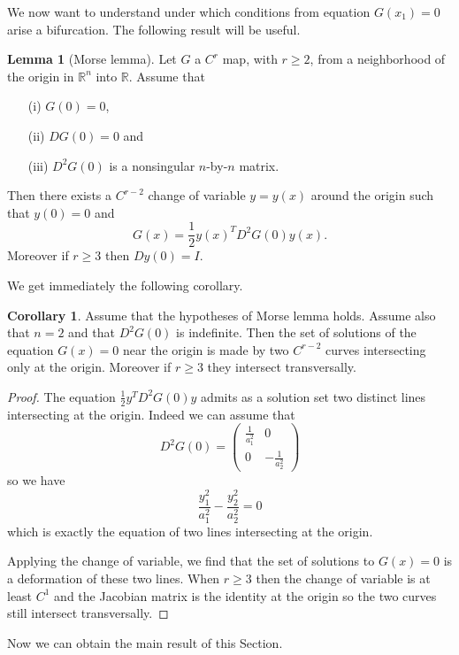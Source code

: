 \documentclass[a4paper,11pt]{article}
\theoremstyle{definition}
\newtheorem{cor}[prop]{Corollary}
\newtheorem{lemma}[prop]{Lemma}
\begin{document}
We now want to understand under which conditions from equation $G(x_1)=0$ arise a bifurcation. The following result will be useful.
\begin{lemma}[Morse lemma]
Let $G$ a $C^r$ map, with $r\ge2$, from a neighborhood of the origin in $\mathbb{R}^n$ into $\mathbb{R}$. Assume that
\begin{itemize}
\item[(i)] $G(0)=0$,
\item[(ii)] $DG(0)=0$ and
\item[(iii)] $D^2G(0)$ is a nonsingular $n$-by-$n$ matrix.
\end{itemize}
Then there exists a $C^{r-2}$ change of variable $y=y(x)$ around the origin such that $y(0)=0$ and
\[
G(x)=\frac{1}{2}y(x)^TD^2G(0)y(x).
\]
Moreover if $r\ge3$ then $Dy(0)=I$.
\end{lemma}
We get immediately the following corollary.
\begin{cor}
\label{cor:cor-morse}
Assume that the hypotheses of Morse lemma holds. Assume also that $n=2$ and that $D^2G(0)$ is indefinite. Then the set of solutions of the equation $G(x)=0$ near the origin is made by two $C^{r-2}$ curves intersecting only at the origin. Moreover if $r\ge3$ they intersect transversally.
\end{cor}
\begin{proof}
The equation $\frac{1}{2}y^TD^2G(0)y$ admits as a solution set two distinct lines intersecting at the origin. Indeed we can assume that
\[
D^2G(0)=
\begin{pmatrix}
\frac{1}{a_1^2} & 0 \\
0 & -\frac{1}{a_2^2}
\end{pmatrix}
\]
so we have
\[
\frac{y_1^2}{a_1^2}-\frac{y_2^2}{a_2^2}=0
\]
which is exactly the equation of two lines intersecting at the origin.

Applying the change of variable, we find that the set of solutions to $G(x)=0$ is a deformation of these two lines. When $r\ge3$ then the change of variable is at least $C^1$ and the Jacobian matrix is the identity at the origin so the two curves still intersect transversally.
\end{proof}
Now we can obtain the main result of this Section.
\end{document}
